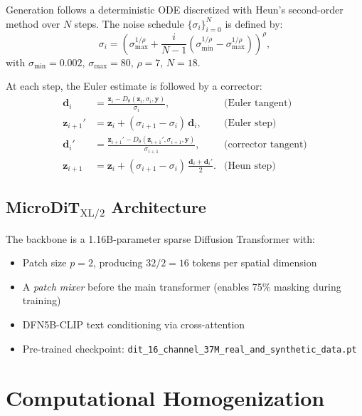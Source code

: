 \documentclass[12pt,a4paper]{article}
\newcommand{\zvec}{\bm{z}}
\theoremstyle{definition}
\begin{document}
Generation follows a deterministic ODE discretized with Heun's second-order
method over $N$ steps.  The noise schedule
$\{\sigma_i\}_{i=0}^{N}$ is defined by:
\begin{equation}
  \sigma_i = \left(
    \sigma_{\max}^{1/\rho} + \frac{i}{N-1}\left(
      \sigma_{\min}^{1/\rho} - \sigma_{\max}^{1/\rho}
    \right)
  \right)^{\!\rho},
  \label{eq:sigma_schedule}
\end{equation}
with $\sigma_{\min}=0.002$, $\sigma_{\max}=80$, $\rho=7$, $N=18$.

At each step, the Euler estimate is followed by a corrector:
\begin{align}
  \bm{d}_i &= \frac{\zvec_i - D_\theta(\zvec_i, \sigma_i, \bm{y})}{\sigma_i},
  & \text{(Euler tangent)} \label{eq:euler}\\
  \zvec_{i+1}' &= \zvec_i + (\sigma_{i+1} - \sigma_i)\, \bm{d}_i,
  & \text{(Euler step)} \\
  \bm{d}_i' &= \frac{\zvec_{i+1}' - D_\theta(\zvec_{i+1}', \sigma_{i+1}, \bm{y})}{\sigma_{i+1}},
  & \text{(corrector tangent)} \\
  \zvec_{i+1} &= \zvec_i + (\sigma_{i+1} - \sigma_i)\, \frac{\bm{d}_i + \bm{d}_i'}{2}.
  & \text{(Heun step)} \label{eq:heun}
\end{align}

\subsection{MicroDiT\texorpdfstring{$_{\text{XL/2}}$}{\_XL/2} Architecture}

The backbone is a 1.16B-parameter sparse Diffusion Transformer with:
\begin{itemize}[nosep]
  \item Patch size $p=2$, producing $32/2 = 16$ tokens per spatial dimension
  \item A \emph{patch mixer} before the main transformer (enables 75\% masking during training)
  \item DFN5B-CLIP text conditioning via cross-attention
  \item Pre-trained checkpoint: \texttt{dit\_16\_channel\_37M\_real\_and\_synthetic\_data.pt}
\end{itemize}

\section{Computational Homogenization}
\label{sec:homog}
\end{document}
